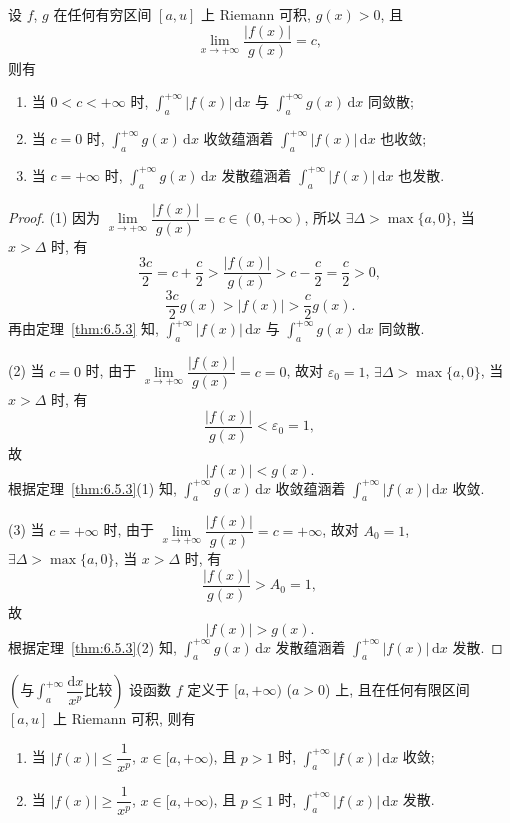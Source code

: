 \begin{theoremp}[无穷积分的比较判别法的极限形式]\label{thm:6.5.3p}
设 $f$, $g$ 在任何有穷区间 $[a,u]$ 上 Riemann 可积, $g(x)>0$, 且
\[
\lim_{x\to+\infty}\frac{|f(x)|}{g(x)}=c,
\]
则有
\begin{enumerate}[label=(\arabic*)]
\item 当 $0<c<+\infty$ 时, $\int_{a}^{+\infty}|f(x)|\,\mathrm{d}x$ 与 $\int_{a}^{+\infty}g(x)\,\mathrm{d}x$ 同敛散;
\item 当 $c=0$ 时, $\int_{a}^{+\infty}g(x)\,\mathrm{d}x$ 收敛蕴涵着 $\int_{a}^{+\infty}|f(x)|\,\mathrm{d}x$ 也收敛;
\item 当 $c=+\infty$ 时, $\int_{a}^{+\infty}g(x)\,\mathrm{d}x$ 发散蕴涵着 $\int_{a}^{+\infty}|f(x)|\,\mathrm{d}x$ 也发散.
\end{enumerate}
\end{theoremp}

\begin{proof}
(1) 因为 $\lim\limits_{x\to+\infty}\dfrac{|f(x)|}{g(x)}=c\in(0,+\infty)$, 所以 $\exists\Delta>\max\{a,0\}$, 当 $x>\Delta$ 时, 有
\[
\frac{3c}{2}=c+\frac{c}{2}>\frac{|f(x)|}{g(x)}>c-\frac{c}{2}=\frac{c}{2}>0,
\]
\[
\frac{3c}{2}g(x)>|f(x)|>\frac{c}{2}g(x).
\]
再由定理~\ref{thm:6.5.3} 知, $\int_{a}^{+\infty}|f(x)|\,\mathrm{d}x$ 与 $\int_{a}^{+\infty}g(x)\,\mathrm{d}x$ 同敛散.

(2) 当 $c=0$ 时, 由于 $\lim\limits_{x\to+\infty}\dfrac{|f(x)|}{g(x)}=c=0$, 故对 $\varepsilon_{0}=1$, $\exists\Delta>\max\{a,0\}$, 当 $x>\Delta$ 时, 有
\[
\frac{|f(x)|}{g(x)}<\varepsilon_{0}=1,
\]
故
\[
|f(x)|<g(x).
\]
根据定理~\ref{thm:6.5.3}(1) 知, $\int_{a}^{+\infty}g(x)\,\mathrm{d}x$ 收敛蕴涵着 $\int_{a}^{+\infty}|f(x)|\,\mathrm{d}x$ 收敛.

(3) 当 $c=+\infty$ 时, 由于 $\lim\limits_{x\to+\infty}\dfrac{|f(x)|}{g(x)}=c=+\infty$, 故对 $A_{0}=1$, $\exists\Delta>\max\{a,0\}$, 当 $x>\Delta$ 时, 有
\[
\frac{|f(x)|}{g(x)}>A_{0}=1,
\]
故
\[
|f(x)|>g(x).
\]
根据定理~\ref{thm:6.5.3}(2) 知, $\int_{a}^{+\infty}g(x)\,\mathrm{d}x$ 发散蕴涵着 $\int_{a}^{+\infty}|f(x)|\,\mathrm{d}x$ 发散.
\end{proof}

\begin{corollary}\label{cor:6.5.1}
$\left(\text{与}\int_{a}^{+\infty}\dfrac{\mathrm{d}x}{x^{p}}\text{比较}\right)$ 设函数 $f$ 定义于 $[a,+\infty)$ ($a>0$) 上, 且在任何有限区间 $[a,u]$ 上 Riemann 可积, 则有
\begin{enumerate}[label=(\arabic*)]
\item 当 $|f(x)|\leqslant\dfrac{1}{x^{p}}$, $x\in[a,+\infty)$, 且 $p>1$ 时, $\int_{a}^{+\infty}|f(x)|\,\mathrm{d}x$ 收敛;
\item 当 $|f(x)|\geqslant\dfrac{1}{x^{p}}$, $x\in[a,+\infty)$, 且 $p\leqslant1$ 时, $\int_{a}^{+\infty}|f(x)|\,\mathrm{d}x$ 发散.
\end{enumerate}
\end{corollary}

